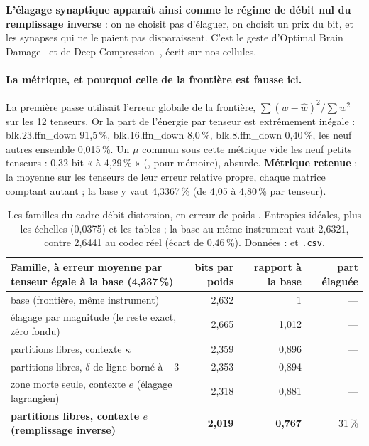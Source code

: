 \textbf{L'élagage synaptique apparaît ainsi comme le régime de débit nul du remplissage inverse} : on ne choisit pas d'élaguer, on choisit un prix du bit, et les synapses qui ne le paient pas disparaissent. C'est le geste d'Optimal Brain Damage~\cite{lecun1989obd} et de Deep Compression~\cite{han2015deepcompression}, écrit sur nos cellules.

\paragraph{La métrique, et pourquoi celle de la frontière est fausse ici.} La première passe utilisait l'erreur globale de la frontière, $\sum (w - \hat w)^2 / \sum w^2$ sur les 12 tenseurs. Or la part de l'énergie par tenseur est extrêmement inégale \mes : blk.23.ffn\_down 91,5\,\%, blk.16.ffn\_down 8,0\,\%, blk.8.ffn\_down 0,40\,\%, les neuf autres ensemble 0,015\,\%. Un $\mu$ commun sous cette métrique vide les neuf petits tenseurs : 0,32 bit « à 4,29\,\% » (, pour mémoire), absurde. \textbf{Métrique retenue} : la moyenne sur les tenseurs de leur erreur relative propre, chaque matrice comptant autant ; la base y vaut 4,3367\,\% (de 4,05 à 4,80\,\% par tenseur).

\begin{table}[tbp]
\centering\footnotesize\setlength{\tabcolsep}{3pt}
\begin{tabularx}{\linewidth}{@{}>{\raggedright\arraybackslash}X r r r@{}}
\toprule
Famille, à erreur moyenne par tenseur égale à la base (4,337\,\%) & bits par poids & rapport à la base & part élaguée \\
\midrule
base (frontière, même instrument) & 2,632 & 1 & — \\
élagage par magnitude (le reste exact, zéro fondu) & 2,665 & 1,012 & — \\
partitions libres, contexte $\kappa$ & 2,359 & 0,896 & — \\
partitions libres, $\delta$ de ligne borné à $\pm 3$ & 2,353 & 0,894 & — \\
zone morte seule, contexte $e$ (élagage lagrangien) & 2,318 & 0,881 & — \\
\textbf{partitions libres, contexte $e$ (remplissage inverse)} & \textbf{2,019} & \textbf{0,767} & 31\,\% \\
\bottomrule
\end{tabularx}
\caption[Le cadre débit-distorsion, en erreur de poids]{Les familles du cadre débit-distorsion, en erreur de poids \mes. Entropies idéales, plus les échelles (0,0375) et les tables ; la base au même instrument vaut 2,6321, contre 2,6441 au codec réel (écart de 0,46\,\%). Données :  et \texttt{.csv}.}
\label{t3pre:tab:rd}
\end{table}

